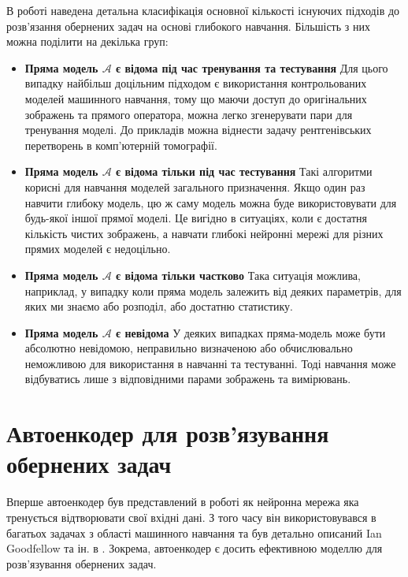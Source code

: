 \documentclass[14pt,a4paper]{extarticle}
\newcounter{e}
\numberwithin{equation}{section}
\numberwithin{figure}{section}
\begin{document}
	В роботі \cite{ongie2020deep} наведена детальна класифікація основної кількості існуючих підходів до розв'язання обернених задач на основі глибокого навчання. 	Більшість з них можна поділити на декілька груп:
	\begin{itemize}
		\item \textbf{Пряма модель $\mathcal{A}$ є відома під час тренування та тестування} \newline
		Для цього випадку найбільш доцільним підходом є використання контрольованих моделей машинного навчання, тому що маючи доступ до оригінальних зображень та прямого оператора, можна легко згенерувати пари для тренування моделі. До прикладів можна віднести задачу рентгенівських перетворень в комп’ютерній томографії.
		
		\item \textbf{Пряма модель $\mathcal{A}$ є відома тільки під час тестування} \newline
		Такі алгоритми корисні для навчання моделей загального призначення. Якщо один раз навчити глибоку модель, цю ж саму модель можна буде використовувати для будь-якої іншої прямої моделі. Це вигідно в ситуаціях, коли є достатня кількість чистих зображень, а навчати глибокі нейронні мережі для різних прямих моделей є недоцільно.
			
		\newpage
		\item \textbf{Пряма модель $\mathcal{A}$ є відома тільки частково} \newline
		Така ситуація можлива, наприклад, у випадку коли пряма модель залежить від деяких параметрів, для яких ми знаємо або розподіл, або достатню статистику.

		\item \textbf{Пряма модель $\mathcal{A}$ є невідома} \newline
		У деяких випадках пряма-модель може бути абсолютно невідомою, неправильно визначеною або обчислювально неможливою для використання в навчанні та тестуванні. Тоді навчання може відбуватись лише з відповідними парами зображень та вимірювань. 
	\end{itemize}
	
	\newpage
	\thispagestyle{empty}
	\section{Автоенкодер для розв'язування обернених задач}

	Вперше автоенкодер був представлений в роботі \cite{10.5555/104279} як нейронна мережа яка тренується відтворювати свої вхідні дані. З того часу він використовувався в багатьох задачах з області машинного навчання та був детально описаний Ian Goodfellow та ін. в \cite{Goodfellow-et-al-2016}. Зокрема, автоенкодер є досить ефективною моделлю для розв'язування обернених задач.
	
\end{document}
